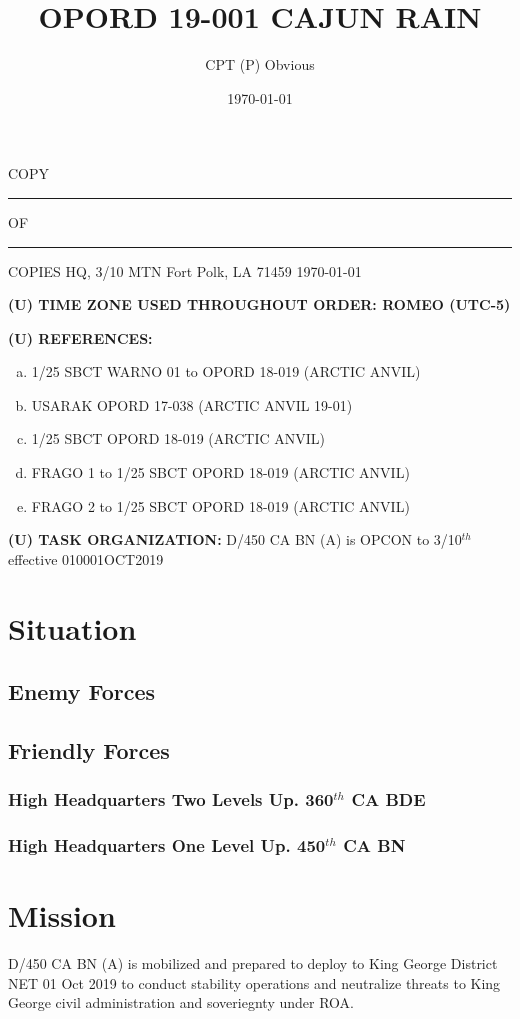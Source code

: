 \documentclass[12pt,letterpaper,notitlepage]{article}
\title{OPORD 19-001 CAJUN RAIN}
\author{CPT (P) Obvious}
\date{\today}
\newcommand{\unclass}{(U)}
\newcommand{\uptwo}{360$^{th}$ CA BDE}
\newcommand{\upone}{450$^{th}$ CA BN}
\newcommand{\unit}{D/450 CA BN (A)}
\newcommand{\timezone}{ROMEO (UTC-5)}
\begin{document}

\begin{flushright}
COPY \rule{1cm}{0.4pt} OF \rule{1cm}{0.4pt} COPIES \linebreak
HQ, 3/10 MTN \linebreak
Fort Polk, LA 71459 \linebreak
\today
\end{flushright}

\textbf{\unclass{} TIME ZONE USED THROUGHOUT ORDER: \timezone}

\textbf{\unclass{} REFERENCES:}
\begin{enumerate}[(a)]
\item 1/25 SBCT WARNO 01 to OPORD 18-019 (ARCTIC ANVIL)
\item USARAK OPORD 17-038 (ARCTIC ANVIL 19-01)
\item 1/25 SBCT OPORD 18-019 (ARCTIC ANVIL)
\item FRAGO 1 to 1/25 SBCT OPORD 18-019 (ARCTIC ANVIL)
\item FRAGO 2 to 1/25 SBCT OPORD 18-019 (ARCTIC ANVIL)
\end{enumerate}

\textbf{\unclass{} TASK ORGANIZATION:}
\unit{} is OPCON to 3/10$^{th}$ effective 010001OCT2019

\section{Situation}
\subsection{Enemy Forces}
\subsection{Friendly Forces}
\subsubsection{High Headquarters Two Levels Up. \uptwo{}}
\subsubsection{High Headquarters One Level Up. \upone{}}

\section{Mission}
\unit{} is mobilized and prepared to deploy to King George District NET 01 Oct 2019
to conduct stability operations and neutralize threats to King George civil
administration and soveriegnty under ROA.
\end{document}
